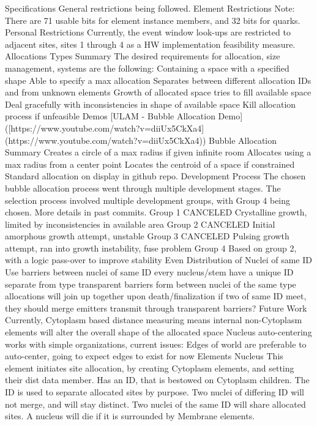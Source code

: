 \documentclass[article]{memoir}
\begin{document}
Specifications
General restrictions being followed.
Element Restrictions
Note: There are 71 usable bits for element instance members, and 32 bits for quarks.
Personal Restrictions
Currently, the event window look-ups are restricted to adjacent sites, sites 1 through 4 as a HW implementation feasibility measure.
Allocations Types
Summary
The desired requirements for allocation, size management, systems are the following:
Containing a space with a specified shape
Able to specify a max allocation
Separates between different allocation IDs and from unknown elements
Growth of allocated space tries to fill available space
Deal gracefully with inconsistencies in shape of available space
Kill allocation process if unfeasible
Demos
[ULAM - Bubble Allocation Demo]([https://www.youtube.com/watch?v=diiUx5CkXa4](https://www.youtube.com/watch?v=diiUx5CkXa4))
Bubble Allocation
Summary
Creates a circle of a max radius if given infinite room
Allocates using a max radius from a center point
Locates the centroid of a space if constrained
Standard allocation on display in github repo.
Development Process
The chosen bubble allocation process went through multiple development stages. The selection process involved multiple development groups, with Group 4 being chosen. More details in past commits.
Group 1 CANCELED 
Crystalline growth, limited by inconsistencies in available area
Group 2 CANCELED 
Initial amorphous growth attempt, unstable
Group 3 CANCELED 
Pulsing growth attempt, ran into growth instability, fuse problem
Group 4
Based on group 2, with a logic pass-over to improve stability
Even Distribution of Nuclei of same ID
Use barriers between nuclei of same ID
every nucleus/stem have a unique ID separate from type
transparent barriers form between nuclei of the same type
allocations will join up together upon death/finalization
if two of same ID meet, they should merge
emitters transmit through transparent barriers?
Future Work
Currently, Cytoplasm based distance measuring means internal non-Cytoplasm elements will alter the overall shape of the allocated space
Nucleus auto-centering works with simple organizations, current issues:
Edges of world are preferable to auto-center, going to expect edges to exist for now
Elements
Nucleus
This element initiates site allocation, by creating Cytoplasm elements, and setting their dist data member.
Has an ID, that is bestowed on Cytoplasm children.
The ID is used to separate allocated sites by purpose.
Two nuclei of differing ID will not merge, and will stay distinct.
Two nuclei of the same ID will share allocated sites.
A nucleus will die if it is surrounded by Membrane elements.
\end{document}
